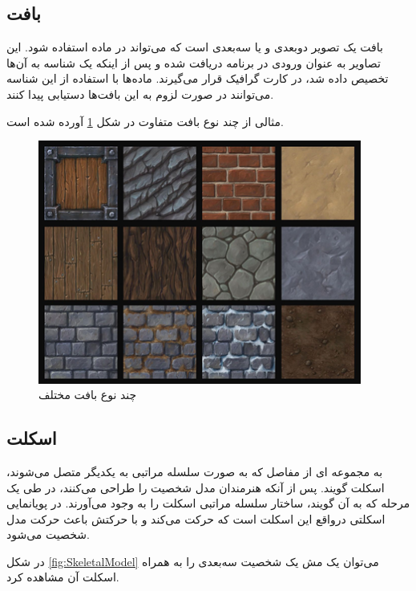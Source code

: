 \subsection{بافت
\protect{}
}
بافت یک تصویر دوبعدی و یا سه‌بعدی است که می‌تواند در ماده استفاده شود.
این تصاویر به عنوان ورودی در برنامه دریافت شده و پس از اینکه یک شناسه به آن‌ها تخصیص داده شد، در کارت گرافیک قرار می‌گیرند. ماده‌ها با استفاده از این شناسه می‌توانند در صورت لزوم به این بافت‌ها دستیابی پیدا کنند.

مثالی از چند نوع بافت متفاوت در شکل 
\ref{fig:Texture}
آورده‌ شده است.

\begin{figure}[ht]
	\centerline{\includegraphics[width=\textwidth,height=8cm,keepaspectratio]{Figures/Ch2/texture.png}}

	\caption{چند نوع بافت مختلف\cite{TextureSource}}
	\label{fig:Texture}
\end{figure}


\subsection{اسکلت}

به مجمو‌عه ای از مفاصل که به صورت سلسله مراتبی به یکدیگر متصل می‌شوند، اسکلت گویند. پس از آنکه هنرمندان مدل شخصیت را طراحی می‌کنند، در طی یک مرحله که به آن
گویند، ساختار سلسله مراتبی اسکلت را به وجود می‌آورند.
در پویانمایی اسکلتی درواقع این اسکلت‌ است که حرکت می‌کند و با حرکتش باعث حرکت مدل شخصیت می‌شود.

در شکل 
\ref{fig:SkeletalModel}
می‌توان یک مش یک شخصیت‌ ‌سه‌بعدی را به همراه اسکلت آن مشاهده کرد.

